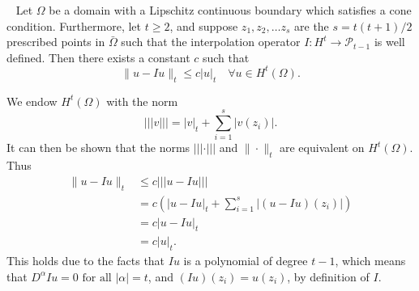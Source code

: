 
\begin{lem}{\quad~\label{lem:6.2}}
Let $\Omega$ be a domain with a Lipschitz continuous boundary which satisfies a cone condition. Furthermore, let $t\geq 2$, and suppose $z_1,z_2,\ldots z_s$ are the
$s = t(t+1)/2$ prescribed points in $\bar{\Omega}$ such that the interpolation operator $I:H^t \rightarrow \mathcal{P}_{t-1}$ is well defined.
Then there exists a constant $c$ such that
\begin{equation}
    \|u-Iu\|_t\leq c|u|_t\quad \forall u\in H^t(\Omega).
    \label{eq:lem_6.2}
\end{equation}
\end{lem}

\begin{bev}
    We endow $H^t(\Omega)$ with the norm 
    \begin{equation*}
        |||v||| = |v|_t + \sum_{i=1}^s |v(z_i)|.
    \end{equation*}
It can then be shown that the norms $|||\cdot|||$ and $\|\cdot\|_t$ are equivalent on $H^t(\Omega)$. Thus
\begin{align*}
    \|u-Iu\|_t&\leq c|||u-Iu|||\\
    &= c(|u-Iu|_t + \sum_{i=1}^s|(u-Iu)(z_i)|)\\
    &= c|u-Iu|_t \\
    &= c|u|_t.
\end{align*}
This holds due to the facts that $Iu$ is a polynomial of degree $t-1$, 
which means that $D^{\alpha} Iu = 0 \text{ for all } |\alpha|=t$, 
and $(Iu)(z_i)=u(z_i)$, by definition of $I$.


\end{bev}
